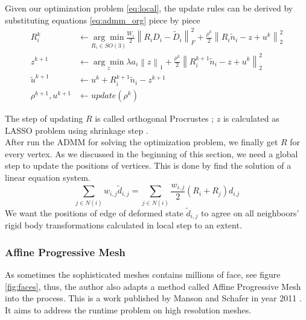 \documentclass[a4paper,10pt]{article}
\begin{document}
Given our optimization problem \ref{eq:local}, the update rules can be derived by substituting equations \ref{eq:admm_org} piece by piece
	\begin{equation}
		\begin{split}
			R_i^k &\leftarrow \underset{R_i\in SO(3)}{\arg \min} \frac{W_{i}}{2}\left\lVert R_i D_i - \tilde{D}_i \right\rVert _F^2 +  \frac{\rho^k}{2} \left\lVert R_i\tilde{n}_i - z + u^k\right\rVert _2^2\\
			z^{k+1} &\leftarrow \underset{z}{\arg \min} \lambda a_i\left\lVert z\right\rVert _1 + \frac{\rho^k}{2} \left\lVert R_i^{k+1}\tilde{n}_i - z + u^k\right\rVert _2^2\\
			\tilde{u}^{k+1} &\leftarrow u^k + R_i^{k+1}\tilde{n}_i - z^{k+1}\\
			\rho^{k+1}, u^{k+1} &\leftarrow update(\rho^k)
		\end{split}
	\end{equation}
	
The step of updating $R$ is called orthogonal Procrustes \cite{Procrustes}; $z$ is calculated as LASSO problem using shrinkage step \cite{admm}.\\

After run the ADMM for solving the optimization problem, we finally get $R$ for every vertex. As we discussed in the beginning of this section, we need a global step to update the positions of vertices. This is done by find the solution of a linear equation system. 
	\begin{equation}
		\sum_{j\in N(i)} w_{i,j} \tilde{d}_{i,j} =\sum_{j\in N(i)} \frac{w_{i,j}}{2}(R_i+R_j)d_{i.j}
	\end{equation}
We want the positions of edge of deformed state $\tilde{d}_{i,j}$ to agree on all neighboors' rigid body transformations calculated in local step to an extent.

\subsubsection{Affine Progressive Mesh}\label{affine}
As sometimes the sophisticated meshes contains millions of face, see figure \ref{fig:faces}, thus, the author also adapts a method called Affine Progressive Mesh into the process. This is a work published by Manson and Schafer in year 2011 \cite{affine}. It aims to address the runtime problem on high resolution meshes. \\
\end{document}
